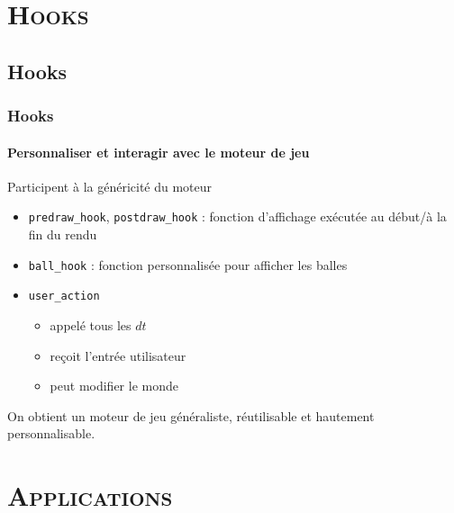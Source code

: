 \documentclass[xcolor=x11names,compress,11pt]{beamer}
\renewcommand{\(}{\begin{columns}}
\renewcommand{\)}{\end{columns}}
\newcommand{\<}[1]{\begin{column}{#1}}
\renewcommand{\>}{\end{column}}
\begin{document}
\section{\scshape Hooks}
\subsection*{Hooks}
\begin{frame}
  \frametitle{Hooks}
  \framesubtitle{Personnaliser et interagir avec le moteur de jeu}

  Participent à la généricité du moteur
  \begin{itemize}
  \item \texttt{predraw\_hook}, \texttt{postdraw\_hook} : fonction
    d'affichage exécutée au début/à la fin du rendu
  \item \texttt{ball\_hook} : fonction personnalisée pour afficher les
    balles
  \item \texttt{user\_action}
    \begin{itemize}
    \item appelé tous les $dt$
    \item reçoit l'entrée utilisateur
    \item peut modifier le monde
    \end{itemize}
  \end{itemize}

  On obtient un moteur de jeu généraliste, réutilisable et hautement
  personnalisable.

\end{frame}

\section{\scshape Applications}
\end{document}
